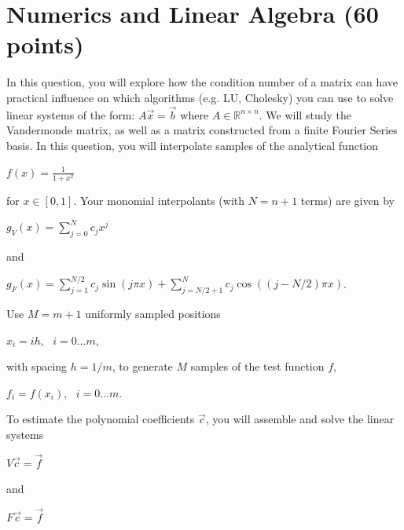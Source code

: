 \documentclass[10pt]{article}
\begin{document}
\section{Numerics and Linear Algebra (60 points)}\label{sec:num_lin_alg}

In this question, you will explore how the condition number of a matrix can have practical influence on which algorithms (e.g. LU, Cholesky) you can use to solve linear systems of the form: $A\vec{x}=\vec{b}$ where $A\in \mathbb{R}^{n\times n}$.
We will study the Vandermonde matrix, as well as a matrix constructed from a finite Fourier Series basis.
In this question, you will interpolate samples of the analytical function

\begin{center}
$f(x)=\frac{1}{1+x^2}$    
\end{center}

for $x\in[0,1]$. Your monomial interpolants (with $N=n+1$ terms) are given by

\begin{center}
$g_V(x)=\sum_{j=0}^{N} c_j x^j$
\end{center}

and

\begin{center}
$g_{F}(x)=\sum_{j=1}^{N / 2} c_{j} \sin (j \pi x)+\sum_{j=N / 2+1}^{N} c_{j} \cos ((j-N / 2) \pi x)$.
\end{center}

Use $M=m+1$ uniformly sampled positions

\begin{center}
$x_i=ih,\text{ }i=0\dots m$,
\end{center}

with spacing $h=1/m$, to generate $M$ samples of the test function $f$,

\begin{center}
$f_i=f(x_i),\text{ }i=0\dots m$.
\end{center}

To estimate the polynomial coefficients $\vec{c}$, you will assemble and solve the linear systems

\begin{center}
$V\vec{c}=\vec{f}$
\end{center}

and

\begin{center}
$F\vec{c}=\vec{f}$
\end{center}
\end{document}
